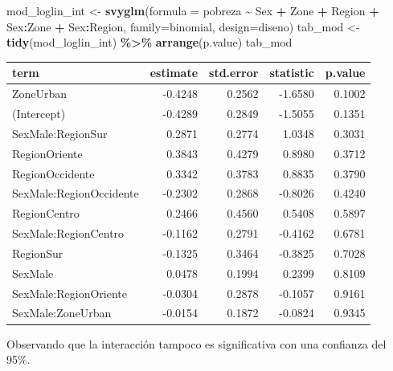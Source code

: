 \documentclass[
  spanish,
  12pt,
]{book}
\newenvironment{Shaded}{\begin{snugshade}}{\end{snugshade}}
\newcommand{\AttributeTok}[1]{\textcolor[rgb]{0.13,0.29,0.53}{#1}}
\newcommand{\FunctionTok}[1]{\textcolor[rgb]{0.13,0.29,0.53}{\textbf{#1}}}
\newcommand{\NormalTok}[1]{#1}
\newcommand{\OtherTok}[1]{\textcolor[rgb]{0.56,0.35,0.01}{#1}}
\newcommand{\SpecialCharTok}[1]{\textcolor[rgb]{0.81,0.36,0.00}{\textbf{#1}}}
\begin{document}
\begin{Shaded}
\begin{Highlighting}[]
\NormalTok{mod\_loglin\_int }\OtherTok{\textless{}{-}} \FunctionTok{svyglm}\NormalTok{(}\AttributeTok{formula =}\NormalTok{ pobreza }\SpecialCharTok{\textasciitilde{}}\NormalTok{ Sex }\SpecialCharTok{+}\NormalTok{ Zone }\SpecialCharTok{+}\NormalTok{ Region }\SpecialCharTok{+} 
\NormalTok{                           Sex}\SpecialCharTok{:}\NormalTok{Zone }\SpecialCharTok{+}\NormalTok{ Sex}\SpecialCharTok{:}\NormalTok{Region,}
                           \AttributeTok{family=}\NormalTok{binomial, }
                           \AttributeTok{design=}\NormalTok{diseno)}
\NormalTok{tab\_mod }\OtherTok{\textless{}{-}} \FunctionTok{tidy}\NormalTok{(mod\_loglin\_int) }\SpecialCharTok{\%\textgreater{}\%} \FunctionTok{arrange}\NormalTok{(p.value)}
\NormalTok{tab\_mod}
\end{Highlighting}
\end{Shaded}

\begin{tabular}{l|r|r|r|r}
\hline
term & estimate & std.error & statistic & p.value\\
\hline
ZoneUrban & -0.4248 & 0.2562 & -1.6580 & 0.1002\\
\hline
(Intercept) & -0.4289 & 0.2849 & -1.5055 & 0.1351\\
\hline
SexMale:RegionSur & 0.2871 & 0.2774 & 1.0348 & 0.3031\\
\hline
RegionOriente & 0.3843 & 0.4279 & 0.8980 & 0.3712\\
\hline
RegionOccidente & 0.3342 & 0.3783 & 0.8835 & 0.3790\\
\hline
SexMale:RegionOccidente & -0.2302 & 0.2868 & -0.8026 & 0.4240\\
\hline
RegionCentro & 0.2466 & 0.4560 & 0.5408 & 0.5897\\
\hline
SexMale:RegionCentro & -0.1162 & 0.2791 & -0.4162 & 0.6781\\
\hline
RegionSur & -0.1325 & 0.3464 & -0.3825 & 0.7028\\
\hline
SexMale & 0.0478 & 0.1994 & 0.2399 & 0.8109\\
\hline
SexMale:RegionOriente & -0.0304 & 0.2878 & -0.1057 & 0.9161\\
\hline
SexMale:ZoneUrban & -0.0154 & 0.1872 & -0.0824 & 0.9345\\
\hline
\end{tabular}

Observando que la interacción tampoco es significativa con una confianza del 95\%.
\end{document}
